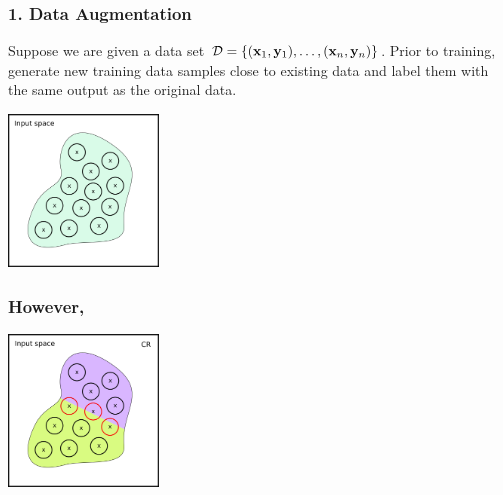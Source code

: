 \documentclass[t,compress,aspectratio=169]{beamer}
\begin{document}
\begin{frame}[fragile]
  \frametitle{1. Data Augmentation}

    \vspace{-1em}



  Suppose we are given a data set $\mathcal{D} =  \{(\mathbf{x}_1, \mathbf{y}_1), \ldots , (\mathbf{x}_n, \mathbf{y}_n)\}$.
  Prior to training, generate new training data samples close to existing data and label them with the same output as the original data.
      {\scriptsize
 \begin{thebibliography}{99}
   \beamertemplatearticlebibitems
\end{thebibliography}}


\begin{center}

  \includegraphics[width=4cm]{img/SR-vs-CR-2.png}

  \end{center}

\end{frame}




\begin{frame}[fragile]
  \frametitle{However,}
  \vspace{-1em}


\begin{center}

  \includegraphics[width=4cm]{img/SR-vs-CR-4.png}

  \end{center}

\end{frame}
\end{document}
